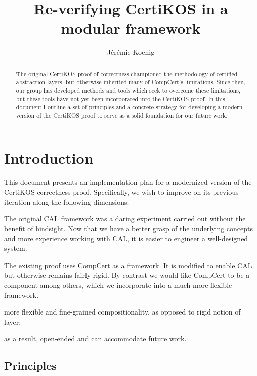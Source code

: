 \documentclass{report}
\title{Re-verifying CertiKOS in a modular framework}
\author{J\'er\'emie Koenig}
\begin{document}
\maketitle

\begin{abstract} %
The original CertiKOS proof of correctness
championed the methodology of certified abstraction layers,
but otherwise inherited many of CompCert's limitations.
Since then,
our group has developed methods and tools
which seek to overcome these limitations,
but these tools
have not yet been incorporated into the CertiKOS proof.
In this document I outline
a set of principles and
a concrete strategy
for developing a modern version of the CertiKOS proof
to serve as a solid foundation
for our future work.
\end{abstract}

\tableofcontents

\listoftheorems[title={List of Tasks},swapnumber]

\chapter{Introduction} %

This document presents an implementation plan
for a modernized version of the CertiKOS correctness proof.
Specifically,
we wish to improve on its previous iteration
along the following dimensions:
\begin{description}
  \item[Focus on usability and best practices.]
    The original CAL framework was a daring experiment
    carried out without the benefit of hindsight.
    Now that we have a better grasp of the underlying concepts
    and more experience working with CAL,
    it is easier to engineer a well-designed system.
  \item[CompCert as a mere component.]
    The existing proof uses CompCert as a framework.
    It is modified to enable CAL but otherwise remains fairly rigid.
    By contrast we would like CompCert to be a component among others,
    which we incorporate into a much more flexible framework.
  \item more flexible and fine-grained compositionality, as opposed to rigid notion of layer;
  \item as a result, open-ended and can accommodate future work.
\end{description}

\section{Principles}
\end{document}
